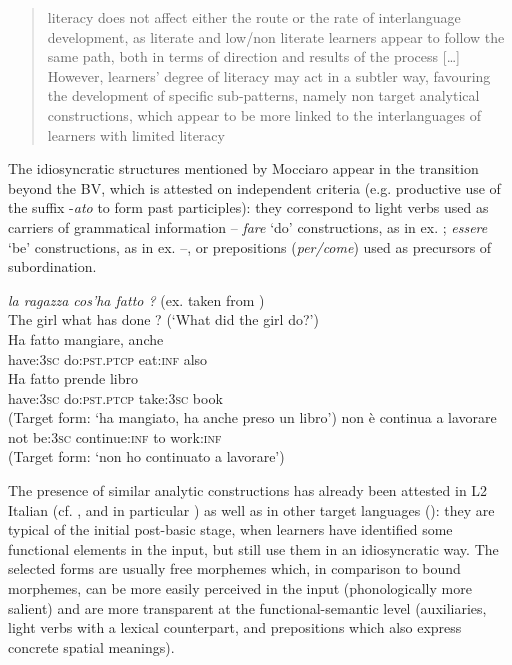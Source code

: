 \documentclass[output=paper]{langscibook}
\begin{document}
\begin{quote}
literacy does not affect either the route or the rate of interlanguage development, as literate and low/non literate learners appear to follow the same path, both in terms of direction and results of the process […] However, learners’ degree of literacy may act in a subtler way, favouring the development of specific sub-patterns, namely non target analytical constructions, which appear to be more linked to the interlanguages of learners with limited literacy\hbox{}\hfill\hbox{\citep[171]{Mocciaro2020}}
\end{quote}

The idiosyncratic structures mentioned by Mocciaro appear in the transition beyond the BV, which is attested on independent criteria (e.g. productive use of the suffix -\textit{ato} to form past participles): they correspond to light verbs used as carriers of grammatical information -- \textit{fare} ‘do’ constructions, as in ex. ; \textit{essere} ‘be’ constructions, as in ex.  --, or prepositions (\textit{per/come}) used as precursors of subordination.

\ea%
    \label{ex:benazzo:5}
       {\textit{la ragazza cos’ha fatto ?} (ex. taken from \citealt{Mocciaro2019})}\\
         {}   {The girl what has done ? (‘What did the girl do?’)}\\

    \gllll Ha     fatto     mangiare, anche\\
    have:3\textsc{sc}   do:\textsc{pst.ptcp}   eat:\textsc{inf} also\\
    Ha     fatto     prende libro\\
    have:3\textsc{sc}   do:\textsc{pst.ptcp}   take:3\textsc{sc} book\\
    \glt (Target form: ‘ha mangiato, ha anche preso un libro’)
\ex%
    \label{ex:benazzo:6}
    \gll non è     continua   a lavorare\\
    not be:3\textsc{sc}  continue:\textsc{inf}   to work:\textsc{inf}\\
    \glt (Target form: ‘non ho continuato a lavorare’) 
\z

The presence of similar analytic constructions has already been attested in L2 Italian (cf. , and in particular \citealt{Bernini2003}) as well as in other target languages (\citealt{BenazzoStarren2007, Starren2001}): they are typical of the initial post-basic stage, when learners have identified some functional elements in the input, but still use them in an idiosyncratic way. The selected forms are usually free morphemes which, in comparison to bound morphemes, can be more easily perceived in the input (phonologically more salient) and are more transparent at the functional-semantic level (auxiliaries, light verbs with a lexical counterpart, and prepositions which also express concrete spatial meanings). 
\end{document}
